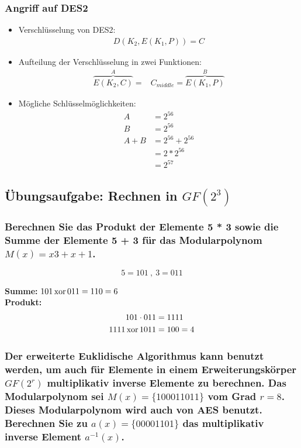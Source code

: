  \subsubsection{Angriff auf DES2}
 \begin{itemize}
     \item Verschlüsselung von DES2:
     \begin{align}
         D( K_2, E( K_1, P )) = C
     \end{align}

     \item Aufteilung der Verschlüsselung in zwei Funktionen:
     \begin{align}
         \overbrace{E(K_2, C)}^{A} = &C_{middle} = \overbrace{E(K_1, P)}^{B}
     \end{align}

     \item Mögliche Schlüsselmöglichkeiten:
     \begin{align*}
         A &= 2^{56}\\
         B &= 2^{56}\\
         A + B &= 2^{56} + 2^{56}\\
         &= 2 * 2^{56}\\
         &= 2^{57}
     \end{align*}

 \end{itemize}



\subsection{Übungsaufgabe: Rechnen in $GF(2^3)$}
\subsubsection{Berechnen Sie das Produkt der Elemente {5} * {3} sowie die Summe der
Elemente {5} + {3} für das Modularpolynom $M(x)=x3+x+1$.}

\[ 5 = 101 ~,~ 3 = 011 \]

\textbf{Summe:}   	$101 \operatorname*{xor} 011 = 110 = 6$ \\
\textbf{Produkt:}   \begin{align}
						101 \cdot 011 &= 1111  \\
                       1111 \operatorname*{xor} 1011 &= 100 = 4
					\end{align} 
					
\subsubsection{Der erweiterte Euklidische Algorithmus kann benutzt werden, um auch für
Elemente in einem Erweiterungskörper $GF(2^r)$ multiplikativ inverse Elemente
zu berechnen. Das Modularpolynom sei $M(x)=\{100011011\}$ vom Grad $r=8$.
Dieses Modularpolynom wird auch von AES benutzt. Berechnen Sie zu
$a(x)=\{00001101\}$ das multiplikativ inverse Element $a^{-1}(x)$.}

